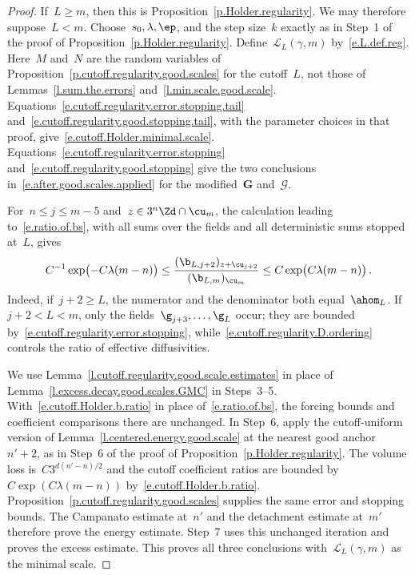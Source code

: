 \documentclass[11pt]{amsart}
\begin{document}
\begin{proof}
If~$L\geq m$, then this is Proposition~\ref{p.Holder.regularity}.  We may therefore suppose~$L<m$.  Choose~$s_0,\lambda,\ep$, and the step size~$k$ exactly as in Step~1 of the proof of Proposition~\ref{p.Holder.regularity}.  Define~$\mathcal L_L(\gamma,m)$ by~\eqref{e.L.def.reg}. Here~$M$ and~$N$ are the random variables of Proposition~\ref{p.cutoff.regularity.good.scales} for the cutoff~$L$, not those of Lemmas~\ref{l.sum.the.errors} and~\ref{l.min.scale.good.scale}. Equations~\eqref{e.cutoff.regularity.error.stopping.tail} and~\eqref{e.cutoff.regularity.good.stopping.tail}, with the parameter choices in that proof, give~\eqref{e.cutoff.Holder.minimal.scale}. Equations~\eqref{e.cutoff.regularity.error.stopping} and~\eqref{e.cutoff.regularity.good.stopping} give the two conclusions in~\eqref{e.after.good.scales.applied} for the modified~$\mathbf G$ and~$\mathcal G$.

\smallskip

For~$n\leq j\leq m-5$ and~$z\in3^n\Zd\cap\cu_m$, the calculation leading to~\eqref{e.ratio.of.bs}, with all sums over the fields and all deterministic sums stopped at~$L$, gives
\begin{equation}
	C^{-1}\exp\bigl(-C\lambda(m-n)\bigr)
	\leq
	\frac{
	(\b_{L,j+2})_{z+\cu_{j+2}}
	}{
	(\b_{L,m})_{\cu_m}
	}
	\leq
	C\exp\bigl(C\lambda(m-n)\bigr)\,.
	\label{e.cutoff.Holder.b.ratio}
\end{equation}
Indeed, if~$j+2\geq L$, the numerator and the denominator both equal~$\ahom_L$.  If~$j+2<L<m$, only the fields~$\g_{j+3},\ldots,\g_L$ occur; they are bounded by~\eqref{e.cutoff.regularity.error.stopping}, while~\eqref{e.cutoff.regularity.D.ordering} controls the ratio of effective diffusivities.

\smallskip

We use Lemma~\ref{l.cutoff.regularity.good.scale.estimates} in place of Lemma~\ref{l.excess.decay.good.scales.GMC} in Steps~3--5. With~\eqref{e.cutoff.Holder.b.ratio} in place of~\eqref{e.ratio.of.bs}, the forcing bounds and coefficient comparisons there are unchanged. In Step~6, apply the cutoff-uniform version of Lemma~\ref{l.centered.energy.good.scale} at the nearest good anchor~$n'+2$, as in Step~6 of the proof of Proposition~\ref{p.Holder.regularity}. The volume loss is~$C3^{d(n'-n)/2}$ and the cutoff coefficient ratios are bounded by~$C\exp(C\lambda(m-n))$ by~\eqref{e.cutoff.Holder.b.ratio}. Proposition~\ref{p.cutoff.regularity.good.scales} supplies the same error and stopping bounds. The Campanato estimate at~$n'$ and the detachment estimate at~$m'$ therefore prove the energy estimate. Step~7 uses this unchanged iteration and proves the excess estimate. This proves all three conclusions with~$\mathcal L_L(\gamma,m)$ as the minimal scale.

\end{proof}
\end{document}
